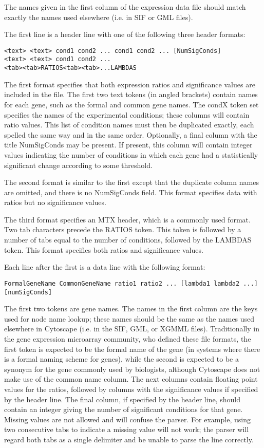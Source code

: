  The names given in the first column of the expression data file should match exactly the names used elsewhere (i.e. in SIF or GML files). 

 The first line is a header line with one of the following three header formats: 

 \begin{verbatim}
<text> <text> cond1 cond2 ... cond1 cond2 ... [NumSigConds]
<text> <text> cond1 cond2 ...
<tab><tab>RATIOS<tab><tab>...LAMBDAS
\end{verbatim}

 The first format specifies that both expression ratios and significance values are included in the file. The first two text tokens (in angled brackets) contain names for each gene, such as the formal and common gene names. The condX token set specifies the names of the experimental conditions; these columns will contain ratio values. This list of condition names must then be duplicated exactly, each spelled the same way and in the same order. Optionally, a final column with the title NumSigConds may be present. If present, this column will contain integer values indicating the number of conditions in which each gene had a statistically significant change according to some threshold. 

 The second format is similar to the first except that the duplicate column names are omitted, and there is no NumSigConds field. This format specifies data with ratios but no significance values. 

 The third format specifies an MTX header, which is a commonly used format. Two tab characters precede the RATIOS token. This token is followed by a number of tabs equal to the number of conditions, followed by the LAMBDAS token. This format specifies both ratios and significance values. 

 Each line after the first is a data line with the following format: 

 \begin{verbatim}
FormalGeneName CommonGeneName ratio1 ratio2 ... [lambda1 lambda2 ...] [numSigConds]

\end{verbatim}
 The first two tokens are gene names. The names in the first column are the keys used for node name lookup; these names should be the same as the names used elsewhere in Cytoscape (i.e. in the SIF, GML, or XGMML files). Traditionally in the gene expression microarray community, who defined these file formats, the first token is expected to be the formal name of the gene (in systems where there is a formal naming scheme for genes), while the second is expected to be a synonym for the gene commonly used by biologists, although Cytoscape does not make use of the common name column. The next columns contain floating point values for the ratios, followed by columns with the significance values if specified by the header line. The final column, if specified by the header line, should contain an integer giving the number of significant conditions for that gene. Missing values are not allowed and will confuse the parser. For example, using two consecutive tabs to indicate a missing value will not work; the parser will regard both tabs as a single delimiter and be unable to parse the line correctly. 

